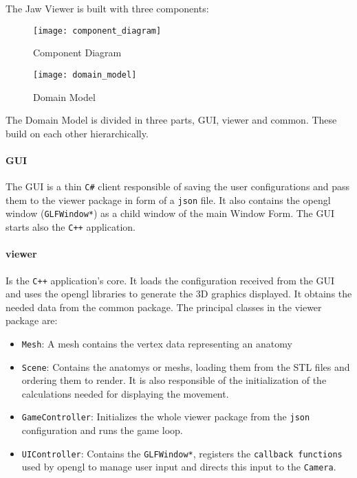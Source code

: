 
The Jaw Viewer is built with three components:

\begin{figure}[h!]
	\centering
	\texttt{[image: component\_diagram]}
	\caption{Component Diagram}
\end{figure}



\begin{figure}[h!]
	\centering
	\texttt{[image: domain\_model]}
	\caption{Domain Model}
\end{figure}

The Domain Model is divided in three parts, GUI, viewer and common. These build on each other hierarchically.

\paragraph{GUI} 
The GUI is a thin \verb|C#| client responsible of saving the user configurations and pass them to the viewer package in form of a \verb|json| file. It also contains the \gls{opengl} window (\verb|GLFWindow*|) as a child window of the main Window Form. The GUI starts also the \verb|C++| application.

\paragraph{viewer} Is the \verb|C++| application's core. It loads the configuration received from the GUI and uses the \gls{opengl} libraries to generate the 3D graphics displayed. It obtains the needed data from the common package.
The principal classes in the viewer package are:

\begin{itemize}
	\item[] \verb|Mesh|: A \gls{mesh} contains the \gls{vertex} data representing an \gls{anatomy}
	\item[] \verb|Scene|: Contains the \glspl{anatomy} or \glspl{mesh}, loading them from the \acrshort{STL} files and ordering them to render. It is also responsible of the initialization of the calculations needed for displaying the movement.	
	\item[] \verb|GameController|: Initializes the whole viewer package from the \verb|json| configuration and runs the game loop.
	\item[] \verb|UIController|: Contains the \verb|GLFWindow*|, registers the \verb|callback functions| used by \gls{opengl} to manage user input and directs this input to the \verb|Camera|.
\end{itemize}



